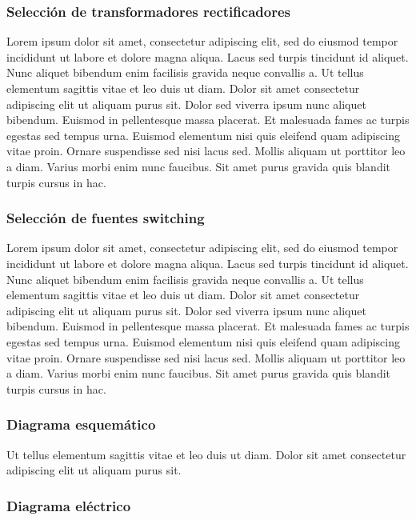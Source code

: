 \subsubsection{Selección de transformadores rectificadores}

Lorem ipsum dolor sit amet, consectetur adipiscing elit, sed do eiusmod tempor incididunt ut labore et dolore magna aliqua. Lacus sed turpis tincidunt id aliquet. Nunc aliquet bibendum enim facilisis gravida neque convallis a. Ut tellus elementum sagittis vitae et leo duis ut diam. Dolor sit amet consectetur adipiscing elit ut aliquam purus sit. Dolor sed viverra ipsum nunc aliquet bibendum. Euismod in pellentesque massa placerat. Et malesuada fames ac turpis egestas sed tempus urna. Euismod elementum nisi quis eleifend quam adipiscing vitae proin. Ornare suspendisse sed nisi lacus sed. Mollis aliquam ut porttitor leo a diam. Varius morbi enim nunc faucibus. Sit amet purus gravida quis blandit turpis cursus in hac.

\subsubsection{Selección de fuentes switching}

Lorem ipsum dolor sit amet, consectetur adipiscing elit, sed do eiusmod tempor incididunt ut labore et dolore magna aliqua. Lacus sed turpis tincidunt id aliquet. Nunc aliquet bibendum enim facilisis gravida neque convallis a. Ut tellus elementum sagittis vitae et leo duis ut diam. Dolor sit amet consectetur adipiscing elit ut aliquam purus sit. Dolor sed viverra ipsum nunc aliquet bibendum. Euismod in pellentesque massa placerat. Et malesuada fames ac turpis egestas sed tempus urna. Euismod elementum nisi quis eleifend quam adipiscing vitae proin. Ornare suspendisse sed nisi lacus sed. Mollis aliquam ut porttitor leo a diam. Varius morbi enim nunc faucibus. Sit amet purus gravida quis blandit turpis cursus in hac.


\subsubsection{Diagrama esquemático} 

Ut tellus elementum sagittis vitae et leo duis ut diam. Dolor sit amet consectetur adipiscing elit ut aliquam purus sit.


\subsubsection{Diagrama eléctrico} 

